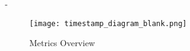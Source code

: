 











- %



\begin{figure}[h!]
\begin{center}
\texttt{[image: timestamp\_diagram\_blank.png]}
\caption{Metrics Overview}
\label{img:latency}
\end{center}
\end{figure}











